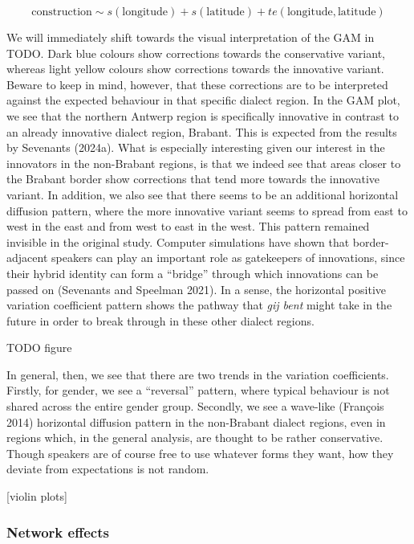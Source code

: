 \documentclass[
  letterpaper,
  DIV=11,
  numbers=noendperiod,
  oneside]{scrartcl}
\begin{document}
\[
\text{construction} \sim s(\text{longitude}) + s(\text{latitude}) + te(\text{longitude}, \text{latitude})
\]

We will immediately shift towards the visual interpretation of the GAM
in TODO. Dark blue colours show corrections towards the conservative
variant, whereas light yellow colours show corrections towards the
innovative variant. Beware to keep in mind, however, that these
corrections are to be interpreted against the expected behaviour in that
specific dialect region. In the GAM plot, we see that the northern
Antwerp region is specifically innovative in contrast to an already
innovative dialect region, Brabant. This is expected from the results by
Sevenants (2024a). What is especially interesting given our interest in
the innovators in the non-Brabant regions, is that we indeed see that
areas closer to the Brabant border show corrections that tend more
towards the innovative variant. In addition, we also see that there
seems to be an additional horizontal diffusion pattern, where the more
innovative variant seems to spread from east to west in the east and
from west to east in the west. This pattern remained invisible in the
original study. Computer simulations have shown that border-adjacent
speakers can play an important role as gatekeepers of innovations, since
their hybrid identity can form a ``bridge'' through which innovations
can be passed on (Sevenants and Speelman 2021). In a sense, the
horizontal positive variation coefficient pattern shows the pathway that
\emph{gij bent} might take in the future in order to break through in
these other dialect regions.

TODO figure

In general, then, we see that there are two trends in the variation
coefficients. Firstly, for gender, we see a ``reversal'' pattern, where
typical behaviour is not shared across the entire gender group.
Secondly, we see a wave-like (François 2014) horizontal diffusion
pattern in the non-Brabant dialect regions, even in regions which, in
the general analysis, are thought to be rather conservative. Though
speakers are of course free to use whatever forms they want, how they
deviate from expectations is not random.

{[}violin plots{]}

\subsubsection{Network effects}\label{sec-regression}
\end{document}
